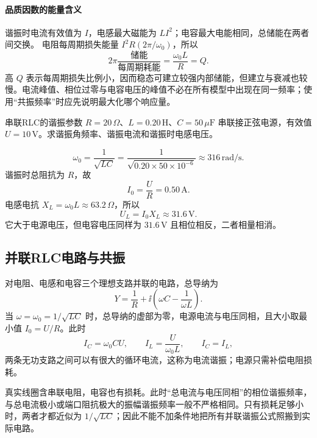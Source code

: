 \paragraph{品质因数的能量含义}
谐振时电流有效值为 $I$，电感最大磁能为 $LI^2$；电容最大电能相同，总储能在两者间交换。
电阻每周期损失能量 $I^2R(2\pi/\omega_0)$，所以
\[
 2\pi\frac{\text{储能}}{\text{每周期耗能}}
 =\frac{\omega_0L}{R}=Q.
\]
高 $Q$ 表示每周期损失比例小，因而稳态可建立较强内部储能，但建立与衰减也较慢。电流峰值、相位过零与电容电压的峰值不必在所有模型中出现在同一频率；使用“共振频率”时应先说明最大化哪个响应量。

\begin{origexamplebox}{串联RLC的谐振参数}
$R=20\,\Omega$、$L=0.20\,\mathrm H$、$C=50\,\mu\mathrm F$ 串联接正弦电源，有效值 $U=10\,\mathrm V$。求谐振角频率、谐振电流和谐振时电感电压。
\end{origexamplebox}
\begin{xesolution}
\[
 \omega_0=\frac1{\sqrt{LC}}
 =\frac1{\sqrt{0.20\times50\times10^{-6}}}
 \approx316\,\mathrm{rad/s}.
\]
谐振时总阻抗为 $R$，故
\[
 I_0=\frac UR=0.50\,\mathrm A.
\]
电感电抗 $X_L=\omega_0L\approx63.2\,\Omega$，所以
\[
 \boxed{U_L=I_0X_L\approx31.6\,\mathrm V}.
\]
它大于电源电压，但电容电压同样为 $31.6\,\mathrm V$ 且相位相反，二者相量相消。
\end{xesolution}


\subsection{并联RLC电路与共振}


对电阻、电感和电容三个理想支路并联的电路，总导纳为
\begin{equation}
 Y=\frac1R+\ii\left(\omega C-\frac1{\omega L}\right).
\end{equation}
当 $\omega=\omega_0=1/\sqrt{LC}$ 时，总导纳的虚部为零，电源电流与电压同相，且大小取最小值 $I_0=U/R$。此时
\begin{equation}
 I_C=\omega_0CU,
 \qquad I_L=\frac{U}{\omega_0L},
 \qquad I_C=I_L,
\end{equation}
两条无功支路之间可以有很大的循环电流，这称为电流谐振；电源只需补偿电阻损耗。

真实线圈含串联电阻，电容也有损耗。此时“总电流与电压同相”的相位谐振频率，与总电流极小或端口阻抗极大的振幅谐振频率一般不严格相同。只有损耗足够小时，两者才都近似为 $1/\sqrt{LC}$；因此不能不加条件地把所有并联谐振公式照搬到实际电路。

